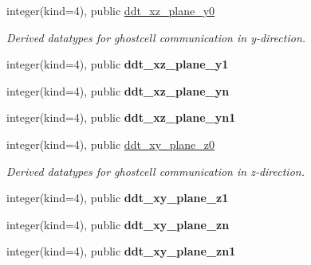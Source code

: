 \textbf{ }\par
\begin{DoxyCompactItemize}
\item 
\mbox{\label{structgeometry_1_1subdomain_aba7fdf219fd1e93e7b8fb10132ac7db7}} 
integer(kind=4), public \hyperlink{structgeometry_1_1subdomain_aba7fdf219fd1e93e7b8fb10132ac7db7}{ddt\+\_\+xz\+\_\+plane\+\_\+y0}
\begin{DoxyCompactList}\small\item\em Derived datatypes for ghostcell communication in y-\/direction. \end{DoxyCompactList}\item 
\mbox{\label{structgeometry_1_1subdomain_a28fdfffc1b152f766cb919e53da06c0d}} 
integer(kind=4), public {\bfseries ddt\+\_\+xz\+\_\+plane\+\_\+y1}
\item 
\mbox{\label{structgeometry_1_1subdomain_af621df7823716c7951bd108925decfe2}} 
integer(kind=4), public {\bfseries ddt\+\_\+xz\+\_\+plane\+\_\+yn}
\item 
\mbox{\label{structgeometry_1_1subdomain_af0f570d4e2eb7d1043de964a815583a3}} 
integer(kind=4), public {\bfseries ddt\+\_\+xz\+\_\+plane\+\_\+yn1}
\end{DoxyCompactItemize}

\textbf{ }\par
\begin{DoxyCompactItemize}
\item 
\mbox{\label{structgeometry_1_1subdomain_aef06388b599b17f785bea869b6b1aa46}} 
integer(kind=4), public \hyperlink{structgeometry_1_1subdomain_aef06388b599b17f785bea869b6b1aa46}{ddt\+\_\+xy\+\_\+plane\+\_\+z0}
\begin{DoxyCompactList}\small\item\em Derived datatypes for ghostcell communication in z-\/direction. \end{DoxyCompactList}\item 
\mbox{\label{structgeometry_1_1subdomain_a62c8f53379792dee38a81714fc7ebf3b}} 
integer(kind=4), public {\bfseries ddt\+\_\+xy\+\_\+plane\+\_\+z1}
\item 
\mbox{\label{structgeometry_1_1subdomain_af89941f108e7136d906a11c126e060c4}} 
integer(kind=4), public {\bfseries ddt\+\_\+xy\+\_\+plane\+\_\+zn}
\item 
\mbox{\label{structgeometry_1_1subdomain_a39515f94c67cf944dd8289abcfc077fa}} 
integer(kind=4), public {\bfseries ddt\+\_\+xy\+\_\+plane\+\_\+zn1}
\end{DoxyCompactItemize}

